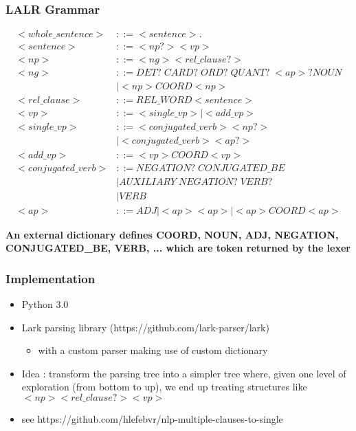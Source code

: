 \documentclass{beamer}
\begin{document}
\begin{frame}
    \frametitle{LALR Grammar}

    {\tiny
    \begin{align*}
        <whole\_sentence> &::= <sentence> .\\
        <sentence> &::= <np?> <vp>\\
        <np> &::= <ng> <rel\_clause?>\\
        <ng> &::= DET?\; CARD?\; ORD?\; QUANT?\; <ap>? NOUN\\
            & | <np> COORD <np>\\
        <rel\_clause> &::= REL\_WORD <sentence>\\
        <vp> &::= <single\_vp> | <add\_vp>\\
        <single\_vp> &::= <conjugated\_verb> <np?>\\
            & | <conjugated\_verb> <ap?>\\
        <add\_vp> &::= <vp> COORD <vp>\\
        <conjugated\_verb> &::= NEGATION?\; CONJUGATED\_BE\\
            & | AUXILIARY\; NEGATION?\; VERB?\\
            & | VERB\\
        <ap> &::= ADJ | <ap> <ap> | <ap> COORD <ap>
    \end{align*}
    }

    \textbf{An external dictionary defines COORD, NOUN, ADJ, NEGATION, CONJUGATED\_BE, VERB, ... which are token returned by the lexer}
\end{frame}

\begin{frame}
    \frametitle{Implementation}
    \begin{itemize}
        \item Python 3.0
        \item Lark parsing library (https://github.com/lark-parser/lark)
        \begin{itemize}
            \item with a custom parser making use of custom dictionary
        \end{itemize}
        \item Idea : transform the parsing tree into a simpler tree where, given one level of exploration (from bottom to up), we end up treating structures like $<np><rel\_clause?><vp>$
        \item see https://github.com/hlefebvr/nlp-multiple-clauses-to-single
    \end{itemize}
\end{frame}
\end{document}
